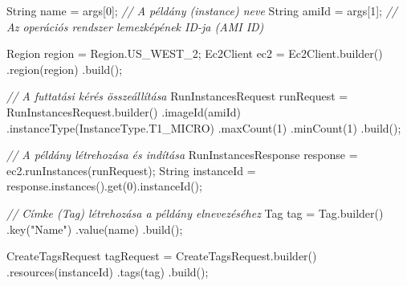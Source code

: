 \documentclass[
]{article}
\newenvironment{Shaded}{}{}
\newcommand{\BuiltInTok}[1]{\textcolor[rgb]{0.00,0.50,0.00}{#1}}
\newcommand{\CommentTok}[1]{\textcolor[rgb]{0.38,0.63,0.69}{\textit{#1}}}
\newcommand{\DecValTok}[1]{\textcolor[rgb]{0.25,0.63,0.44}{#1}}
\newcommand{\FunctionTok}[1]{\textcolor[rgb]{0.02,0.16,0.49}{#1}}
\newcommand{\NormalTok}[1]{#1}
\newcommand{\OperatorTok}[1]{\textcolor[rgb]{0.40,0.40,0.40}{#1}}
\newcommand{\StringTok}[1]{\textcolor[rgb]{0.25,0.44,0.63}{#1}}
\begin{document}
\begin{Shaded}
\begin{Highlighting}[]
\BuiltInTok{String}\NormalTok{ name }\OperatorTok{=}\NormalTok{ args}\OperatorTok{[}\DecValTok{0}\OperatorTok{];}       \CommentTok{// A példány (instance) neve}
\BuiltInTok{String}\NormalTok{ amiId }\OperatorTok{=}\NormalTok{ args}\OperatorTok{[}\DecValTok{1}\OperatorTok{];}      \CommentTok{// Az operációs rendszer lemezképének ID{-}ja (AMI ID)}

\BuiltInTok{Region}\NormalTok{ region }\OperatorTok{=} \BuiltInTok{Region}\OperatorTok{.}\FunctionTok{US\_WEST\_2}\OperatorTok{;}
\NormalTok{Ec2Client ec2 }\OperatorTok{=}\NormalTok{ Ec2Client}\OperatorTok{.}\FunctionTok{builder}\OperatorTok{()}
        \OperatorTok{.}\FunctionTok{region}\OperatorTok{(}\NormalTok{region}\OperatorTok{)}
        \OperatorTok{.}\FunctionTok{build}\OperatorTok{();}

\CommentTok{// A futtatási kérés összeállítása}
\NormalTok{RunInstancesRequest runRequest }\OperatorTok{=}\NormalTok{ RunInstancesRequest}\OperatorTok{.}\FunctionTok{builder}\OperatorTok{()}
        \OperatorTok{.}\FunctionTok{imageId}\OperatorTok{(}\NormalTok{amiId}\OperatorTok{)}
        \OperatorTok{.}\FunctionTok{instanceType}\OperatorTok{(}\NormalTok{InstanceType}\OperatorTok{.}\FunctionTok{T1\_MICRO}\OperatorTok{)}
        \OperatorTok{.}\FunctionTok{maxCount}\OperatorTok{(}\DecValTok{1}\OperatorTok{)}
        \OperatorTok{.}\FunctionTok{minCount}\OperatorTok{(}\DecValTok{1}\OperatorTok{)}
        \OperatorTok{.}\FunctionTok{build}\OperatorTok{();}

\CommentTok{// A példány létrehozása és indítása}
\NormalTok{RunInstancesResponse response }\OperatorTok{=}\NormalTok{ ec2}\OperatorTok{.}\FunctionTok{runInstances}\OperatorTok{(}\NormalTok{runRequest}\OperatorTok{);}
\BuiltInTok{String}\NormalTok{ instanceId }\OperatorTok{=}\NormalTok{ response}\OperatorTok{.}\FunctionTok{instances}\OperatorTok{().}\FunctionTok{get}\OperatorTok{(}\DecValTok{0}\OperatorTok{).}\FunctionTok{instanceId}\OperatorTok{();}

\CommentTok{// Címke (Tag) létrehozása a példány elnevezéséhez}
\NormalTok{Tag tag }\OperatorTok{=}\NormalTok{ Tag}\OperatorTok{.}\FunctionTok{builder}\OperatorTok{()}
        \OperatorTok{.}\FunctionTok{key}\OperatorTok{(}\StringTok{"Name"}\OperatorTok{)}
        \OperatorTok{.}\FunctionTok{value}\OperatorTok{(}\NormalTok{name}\OperatorTok{)}
        \OperatorTok{.}\FunctionTok{build}\OperatorTok{();}

\NormalTok{CreateTagsRequest tagRequest }\OperatorTok{=}\NormalTok{ CreateTagsRequest}\OperatorTok{.}\FunctionTok{builder}\OperatorTok{()}
        \OperatorTok{.}\FunctionTok{resources}\OperatorTok{(}\NormalTok{instanceId}\OperatorTok{)}
        \OperatorTok{.}\FunctionTok{tags}\OperatorTok{(}\NormalTok{tag}\OperatorTok{)}
        \OperatorTok{.}\FunctionTok{build}\OperatorTok{();}


\end{Highlighting}
\end{Shaded}
\end{document}
